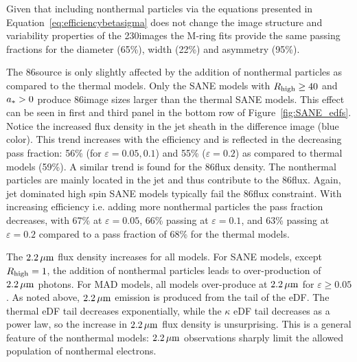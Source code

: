 
Given that including nonthermal particles via the equations presented in Equation~\ref{eq:efficiencybetasigma} does not change the image structure and variability properties of the 230\GHz images the M-ring fits provide the same passing fractions for the diameter (65\%), width (22\%) and asymmetry (95\%).


The 86\GHz source is only slightly affected by the addition of nonthermal particles as compared to the thermal models.
Only the SANE models with $R_\mathrm{high} \geq 40$ and $a_* > 0$ produce 86\GHz image sizes larger than the thermal SANE models.
This effect can be seen in  first and third panel in the bottom row of Figure~\ref{fig:SANE_edfs}.
Notice the increased flux density in the jet sheath in the difference image (blue color).
This trend increases with the efficiency and is reflected in the decreasing pass fraction: 56\% (for $\varepsilon=0.05,0.1$) and 55\% ($\varepsilon=0.2$) as compared to thermal models (59\%).
A similar trend is found for the 86\GHz flux density.
The nonthermal particles are mainly located in the jet and thus contribute to the 86\GHz flux.
Again, jet dominated high spin SANE models typically fail the 86\GHz flux constraint.
With increasing efficiency i.e.
adding more nonthermal particles the pass fraction decreases, with 67\%  at $\varepsilon=0.05$, 66\% passing at $\varepsilon=0.1$, and 63\% passing at  $\varepsilon=0.2$ compared to a pass fraction of
68\% for the thermal models.


The $2.2\,\mu\mathrm{m}$ flux density increases for all models.
For SANE models, except $R_\mathrm{high}=1$, the addition of nonthermal particles leads to over-production of $2.2\,\mu\mathrm{m}$ photons.
For MAD models, all models over-produce at $2.2\,\mu\mathrm{m}$ for $\varepsilon \ge 0.05$.
As noted above, $2.2\,\mu\mathrm{m}$ emission is produced from the tail of the eDF.
The thermal eDF tail decreases exponentially, while the $\kappa$ eDF tail decreases as a power law, so the increase in $2.2\,\mu\mathrm{m}$ flux density is unsurprising.
This is a general feature of the nonthermal models: $2.2\,\mu\mathrm{m}$ observations sharply limit the allowed population of nonthermal electrons.

